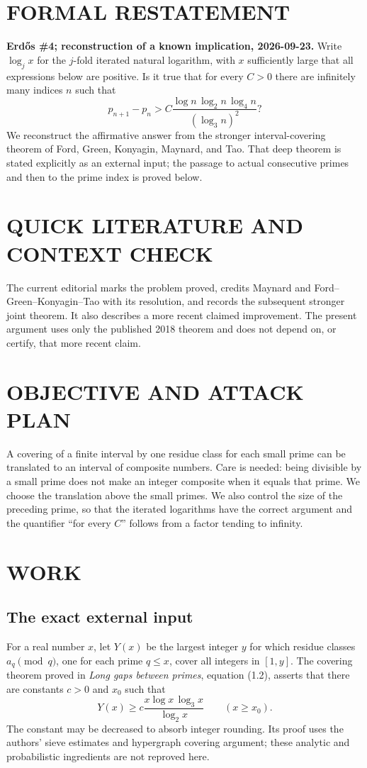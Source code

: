\section{FORMAL RESTATEMENT}
\textbf{Erd\H{o}s \#4; reconstruction of a known implication, 2026-09-23.}
Write $\log_j x$ for the $j$-fold iterated natural logarithm, with $x$ sufficiently large that all expressions below are positive. Is it true that for every $C>0$ there are infinitely many indices $n$ such that
\[
 p_{n+1}-p_n>C\frac{\log n\,\log_2n\,\log_4n}{(\log_3n)^2}?
\]
We reconstruct the affirmative answer from the stronger interval-covering theorem of Ford, Green, Konyagin, Maynard, and Tao. That deep theorem is stated explicitly as an external input; the passage to actual consecutive primes and then to the prime index is proved below.

\section{QUICK LITERATURE AND CONTEXT CHECK}
The current editorial marks the problem proved, credits Maynard and Ford--Green--Konyagin--Tao with its resolution, and records the subsequent stronger joint theorem. It also describes a more recent claimed improvement. The present argument uses only the published 2018 theorem and does not depend on, or certify, that more recent claim.

\section{OBJECTIVE AND ATTACK PLAN}
A covering of a finite interval by one residue class for each small prime can be translated to an interval of composite numbers. Care is needed: being divisible by a small prime does not make an integer composite when it equals that prime. We choose the translation above the small primes. We also control the size of the preceding prime, so that the iterated logarithms have the correct argument and the quantifier ``for every $C$'' follows from a factor tending to infinity.

\section{WORK}
\subsection{The exact external input}
For a real number $x$, let $Y(x)$ be the largest integer $y$ for which residue classes $a_q\pmod q$, one for each prime $q\le x$, cover all integers in $[1,y]$. The covering theorem proved in \emph{Long gaps between primes}, equation (1.2), asserts that there are constants $c>0$ and $x_0$ such that
\[
 Y(x)\ge c\frac{x\log x\,\log_3x}{\log_2x}
 \qquad(x\ge x_0).
\tag{1}
\]
The constant may be decreased to absorb integer rounding. Its proof uses the authors' sieve estimates and hypergraph covering argument; these analytic and probabilistic ingredients are not reproved here.

